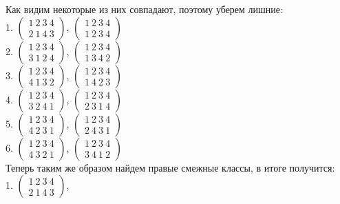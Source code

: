 \documentclass[12pt,a4paper]{scrartcl}
\begin{document}
	Как видим некоторые из них совпадают, поэтому уберем лишние:\\
	1. 	$\begin{pmatrix}
	1~2~3~4\\
	2~1~4~3	\end{pmatrix}$, 
		$\begin{pmatrix}
	1~2~3~4\\
	1~2~3~4	\end{pmatrix}$ \\
	2. 	$\begin{pmatrix}
	1~2~3~4\\
	3~1~2~4	\end{pmatrix}$, 
	$\begin{pmatrix}
	1~2~3~4\\
	1~3~4~2	\end{pmatrix}$ \\
	3. 	$\begin{pmatrix}
	1~2~3~4\\
	4~1~3~2	\end{pmatrix}$, 
	$\begin{pmatrix}
	1~2~3~4\\
	1~4~2~3	\end{pmatrix}$ \\
	4. 	$\begin{pmatrix}
	1~2~3~4\\
	3~2~4~1	\end{pmatrix}$, 
	$\begin{pmatrix}
	1~2~3~4\\
	2~3~1~4	\end{pmatrix}$ \\
	5. 	$\begin{pmatrix}
	1~2~3~4\\
	4~2~3~1	\end{pmatrix}$, 
	$\begin{pmatrix}
	1~2~3~4\\
	2~4~3~1	\end{pmatrix}$ \\
	6. 	$\begin{pmatrix}
	1~2~3~4\\
	4~3~2~1	\end{pmatrix}$, 
	$\begin{pmatrix}
	1~2~3~4\\
	3~4~1~2	\end{pmatrix}$ \\
	Теперь таким же образом найдем правые смежные классы, в итоге получится: \\
	1. 	$\begin{pmatrix}
	1~2~3~4\\
	2~1~4~3	\end{pmatrix}$, 
\end{document}

